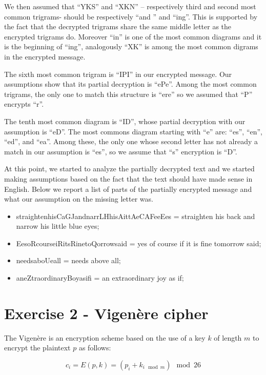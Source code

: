 \documentclass[12pt]{article}
\begin{document}
We then assumed that “YKS” and “XKN” – respectively third and second most common trigrams- should be respectively “and ” and “ing”. This is supported by the fact that the decrypted trigrams share the same middle letter as the encrypted trigrams do. Moreover “in” is one of the most common diagrams and it is the beginning of “ing”, analogously “XK” is among the most common digrams in the encrypted message.

The sixth most common trigram is “IPI” in our encrypted message. Our assumptions show that its partial decryption is “ePe”. Among the most common trigrams, the only one to match this structure is “ere” so we assumed that “P” encrypts “r”.  

The tenth most common diagram is “ID”, whose partial decryption with our assumption is “eD”. The most commons diagram starting with “e” are: “es”, “en”, “ed”, and “ea”. Among these, the only one whose second letter has not already a match in our assumption is “es”, so we assume that “s” encryption is “D”. 

At this point, we started to analyze the partially decrypted text and we started making assumptions based on the fact that the text should have made sense in English. Below we report a list of parts of the partially encrypted message and what our assumption on the missing letter was.

\begin{itemize}
    \item straightenhisCaGJandnarrLHhisAittAeCAFeeEes = straighten his back and narrow his little blue eyes;
    \item EesoRcourseiRitsRinetoQorrowsaid = yes of course if it is fine tomorrow said;
    \item needsaboUeall = needs above all;
    \item aneZtraordinaryBoyasifi = an extraordinary joy as if;
\end{itemize} 




\section{Exercise 2 - Vigenère cipher}

The Vigenère is an encryption scheme based on the use of a key $k$ of length $m$ to encrypt the plaintext $p$ as follows:

\begin{equation*}
  c_i = E(p,k) = (p_i + k_{i\mod{m}})\mod{26}
\end{equation*}
\end{document}
